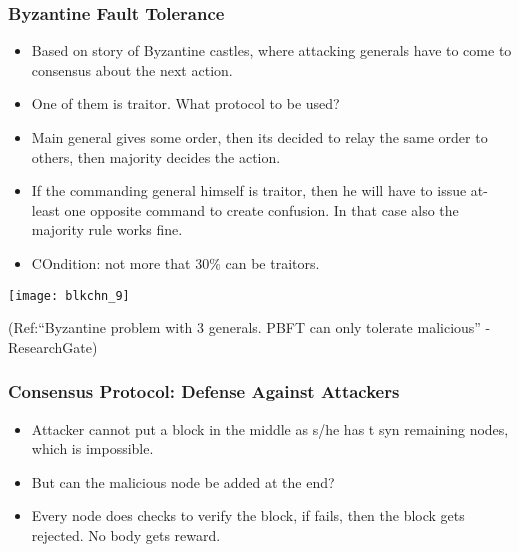 \begin{frame}[fragile]\frametitle{Byzantine Fault Tolerance}
\begin{itemize}
\item Based on story of Byzantine castles,  where attacking generals have to come to consensus about the next action.
\item One of them is traitor. What protocol to be used?
\item Main general gives some order, then its decided to relay the same order to others, then majority decides the action.
\item If the commanding general himself is traitor, then he will have to issue at-least one opposite command to create confusion. In that case also the majority rule works fine.
\item COndition: not more that 30\% can be traitors.
\end{itemize}

\begin{center}
\texttt{[image: blkchn\_9]}

{\tiny (Ref:``Byzantine problem with 3 generals. PBFT can only tolerate malicious'' - ResearchGate)}
\end{center}

\end{frame}

\begin{frame}[fragile]\frametitle{Consensus Protocol: Defense Against Attackers}
\begin{itemize}
\item Attacker cannot put a block in the middle as s/he has t syn remaining nodes, which is impossible.
\item But can the malicious node be added at the end?
\item Every node does checks to verify the block, if fails, then the block gets rejected. No body gets reward.
\end{itemize}

\end{frame}

